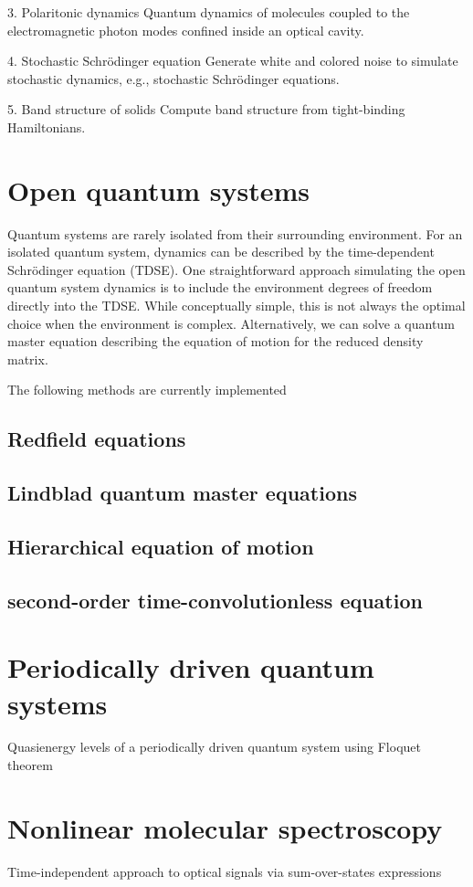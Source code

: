 \documentclass[a4paper,12pt]{book}
\begin{document}
3. Polaritonic dynamics
Quantum dynamics of molecules coupled to the electromagnetic photon modes confined inside an optical cavity.

4. Stochastic Schrödinger equation
Generate white and colored noise to simulate stochastic dynamics, e.g., stochastic Schrödinger equations.

5. Band structure of solids
Compute band structure from tight-binding Hamiltonians.

\chapter{Open quantum systems}
Quantum systems are rarely isolated from their surrounding environment. For an isolated quantum system, dynamics can be described by the time-dependent Schrödinger equation (TDSE). One straightforward approach simulating the open quantum system dynamics is to include the environment degrees of freedom directly into the TDSE. While conceptually simple, this is not always the optimal choice when the environment is complex. Alternatively, we can solve a quantum master equation describing the equation of motion for the reduced density matrix.

The following methods are currently implemented

\section{Redfield equations}

\section{Lindblad quantum master equations}
\section{Hierarchical equation of motion}
\section{second-order time-convolutionless equation}

\chapter{Periodically driven quantum systems}
Quasienergy levels of a periodically driven quantum system using Floquet theorem


\chapter{Nonlinear molecular spectroscopy}
Time-independent approach to optical signals via sum-over-states expressions
\end{document}
